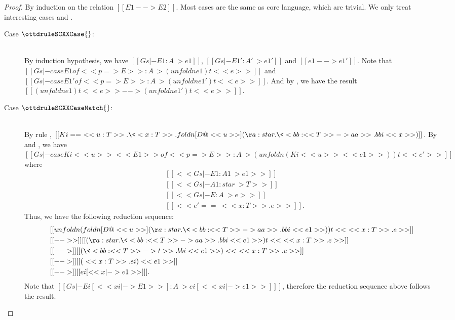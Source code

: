 \begin{proof}
    By induction on the relation $[[E1 --> E2]]$. Most cases are the same as
core language, which are trivial. We only treat interesting cases
 and .
    \begin{description}
        \item[Case \scriptsize{$\ottdruleSCXXCase{}$}:] $\quad$ \\
        By induction hypothesis, we have $[[Gs |- E1 : A ~> e1]]$, $[[Gs |- E1'
: A' ~> e1']]$ and $[[e1 --> e1']]$. Note that $[[Gs |- case E1 of << p => E >>
: A ~> (unfoldn e1) t <<e>>]]$ and $[[Gs |- case E1' of << p => E >> : A ~>
(unfoldn e1') t <<e>>]]$. And by , we have the result
$[[(unfoldn e1) t <<e>> --> (unfoldn e1') t <<e>>]]$.
        \item[Case \scriptsize{$\ottdruleSCXXCaseMatch{}$}:] $\quad$ \\
        By rule , $[[Ki == \ <<u:T>> . \<<x:T>> . foldn
[D@<<u>>] (\aa:star.\<<bb : <<T>> -> aa >> . bbi <<x>>)]]$. By
 and , we have $[[Gs |- case Ki <<u>>
<<E1>> of <<p=>E>> : A ~> (unfoldn (Ki <<u>> <<e1>>)) t <<e'>>]]$ where
        \begin{align*}
                & [[<<Gs |- E1 : A1 ~> e1>>]] \\
                & [[<<Gs |- A1 : star ~> T>>]] \\
                & [[<<Gs |- E : A ~> e>>]] \\
                & [[<<e' == \ <<x:T>>.e >>]].
        \end{align*}
        Thus, we have the following reduction sequence:
        \begin{align*}
            &[[unfoldn (foldn [D@<<u>>] (\aa:star.\<<bb : <<T>> -> aa >> . bbi
<<e1>>)) t <<\ <<x:T>>.e>>]] \\
            &[[-->>]]  [[(\aa:star.\<<bb : <<T>> -> aa >> . bbi <<e1>>) t <<\
<<x:T>>.e>>]] \\
            &[[-->]]  [[(\<<bb : <<T>> -> t >> . bbi <<e1>>) <<\ <<x:T>>.e>>]]
\\
            &[[-->]]  [[(\ <<x:T>>.ei) <<e1>>]] \\
            &[[-->]]  [[ei [<<x |-> e1>>] ]].
        \end{align*}
        Note that $[[Gs |- Ei [ << xi |-> E1 >> ] : A ~> ei [ << xi |-> e1 >> ]
]]$, therefore the reduction sequence above follows the result.
    \end{description}
\end{proof}

